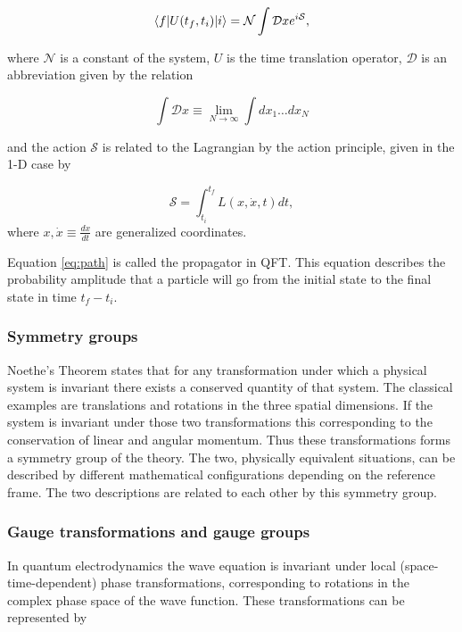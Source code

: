 \begin{equation} \label{eq:path}
	\langle f| U(t_f,t_i) |i \rangle = \mathcal{N} \int \mathcal{D}x e^{i\mathcal{S}},
\end{equation}

where $\mathcal{N}$ is a constant of the system, $U$ is the time translation operator, $\mathcal{D}$ is an abbreviation given by the relation 

\begin{equation}
	\int \mathcal{D} x \equiv \lim_{N \to \infty} \int dx_1 \dots dx_N
\end{equation}

and the action $\mathcal{S}$ is related to the Lagrangian by the action principle, given in the 1-D case by

\begin{equation}
	\mathcal{S} = \int_{t_i}^{t_f} L(x,\dot{x},t)dt,
\end{equation}
where $x, \dot{x} \equiv \frac{dx}{dt}$ are generalized coordinates.

Equation \eqref{eq:path} is called the propagator in QFT. This equation describes the probability amplitude that a particle will go from the initial state to the final state in time $t_f - t_i$.

\subsubsection{Symmetry groups}
Noethe's Theorem states that for any transformation under which a physical system is invariant there exists a conserved quantity of that system. The classical examples are translations and rotations in the three spatial dimensions. If the system is invariant under those two transformations this corresponding to the conservation of linear and angular momentum. Thus these transformations forms a symmetry group of the theory. The two, physically equivalent situations, can be described by different mathematical configurations depending on the reference frame. The two descriptions are related to each other by this symmetry group.

\subsubsection{Gauge transformations and gauge groups}
In quantum electrodynamics the wave equation is invariant under local (space-time-dependent) phase transformations, corresponding to rotations in the complex phase space of the wave function. These transformations can be represented by

